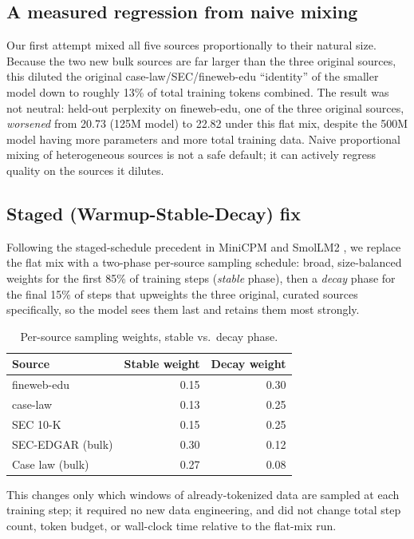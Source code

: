 \documentclass[11pt]{article}
\begin{document}
\subsection{A measured regression from naive mixing}
\label{sec:flatmix}

Our first attempt mixed all five sources proportionally to their natural
size. Because the two new bulk sources are far larger than the three
original sources, this diluted the original case-law/SEC/fineweb-edu
``identity'' of the smaller model down to roughly 13\% of total training
tokens combined. The result was not neutral: held-out perplexity on
fineweb-edu, one of the three original sources, \emph{worsened} from 20.73
(125M model) to 22.82 under this flat mix, despite the 500M model having
more parameters and more total training data. Naive proportional mixing
of heterogeneous sources is not a safe default; it can actively regress
quality on the sources it dilutes.

\subsection{Staged (Warmup-Stable-Decay) fix}

Following the staged-schedule precedent in MiniCPM \citep{hu2024minicpm}
and SmolLM2 \citep{allal2025smollm2}, we replace the flat mix with a
two-phase per-source sampling schedule: broad, size-balanced weights for
the first 85\% of training steps (\emph{stable} phase), then a
\emph{decay} phase for the final 15\% of steps that upweights the three
original, curated sources specifically, so the model sees them last and
retains them most strongly.

\begin{table}[h]
\centering
\caption{Per-source sampling weights, stable vs.\ decay phase.}
\label{tab:wsd}
\begin{tabular}{lrr}
\toprule
\textbf{Source} & \textbf{Stable weight} & \textbf{Decay weight} \\
\midrule
fineweb-edu & 0.15 & 0.30 \\
case-law & 0.13 & 0.25 \\
SEC 10-K & 0.15 & 0.25 \\
SEC-EDGAR (bulk) & 0.30 & 0.12 \\
Case law (bulk) & 0.27 & 0.08 \\
\bottomrule
\end{tabular}
\end{table}

This changes only which windows of already-tokenized data are sampled at
each training step; it required no new data engineering, and did not
change total step count, token budget, or wall-clock time relative to the
flat-mix run.
\end{document}
